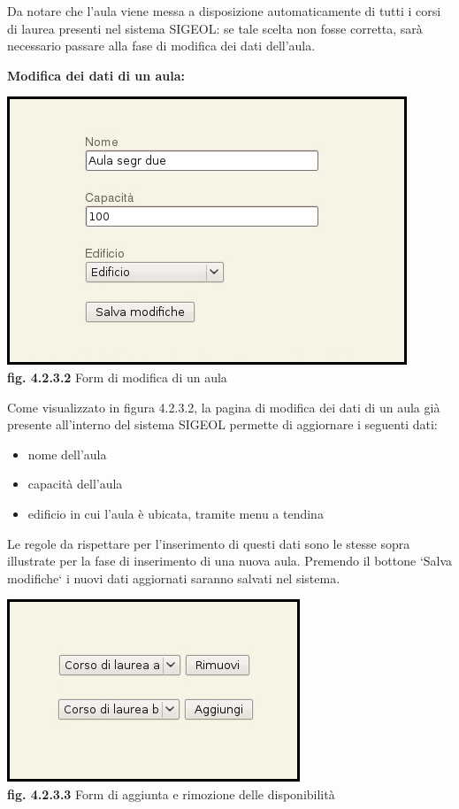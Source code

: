 \documentclass[11pt,a4paper]{article}
\begin{document}
Da notare che l'aula viene messa a disposizione automaticamente di tutti i corsi di laurea presenti nel sistema SIGEOL: se tale scelta non fosse corretta, sarà necessario passare alla fase di modifica dei dati dell'aula.
\newline \newline
\begin{large}\textbf{Modifica dei dati di un aula:}\end{large}

\begin{center}
	\includegraphics[scale=0.5]{images/modifica_aula.jpg}\\
	\textbf{fig. 4.2.3.2} Form di modifica di un aula\\
\end{center}

Come visualizzato in figura 4.2.3.2, la pagina di modifica dei dati di un aula già presente all'interno del sistema SIGEOL permette di aggiornare i seguenti dati:
\begin{itemize}
 \item nome dell'aula
 \item capacità dell'aula
 \item edificio in cui l'aula è ubicata, tramite menu a tendina
\end{itemize}
Le regole da rispettare per l'inserimento di questi dati sono le stesse sopra illustrate per la fase di inserimento di una nuova aula.
Premendo il bottone `Salva modifiche` i nuovi dati aggiornati saranno salvati nel sistema.

\begin{center}
	\includegraphics[scale=0.5]{images/modifica_aula_corso.jpg}\\
	\textbf{fig. 4.2.3.3} Form di aggiunta e rimozione delle disponibilità\\
\end{center}
\end{document}
